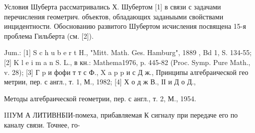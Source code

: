 \documentclass[10pt]{article}
\begin{document}
Условия Шуберта рассматривались Х. Шубертом [1] в связи с задачами перечисления геометрич. объектов, обладающих заданыыми свойствами инцидентности. Обоснованию развитого Шубертом исчисления посвящена 15-я проблема Гильберта (см. [2]).



Jum.: [1] S c h u b e r t H., "Mitt. Math. Ges. Hamburg", 1889 , Bd 1, S. 134-55; [2] K l e i m a n S. L., в кн.: Mathema1976, p. 445-82 (Proc. Symp. Pure Math., v. 28); [3] Г p и фофи т т с Ф., X a p p и с Д ж., Принципы алгебраической гео метрии, пер. с англ., т. 1, М., 1982; [4] Х о д ж В., ІІ и Д о Д.,

Методы алгебраической геометрии, пер. с англ., т. 2, М., 1954.



IIIУМ А ЛИТИВНБIИ-помеха, прибавляемая К сигналу при передаче его по каналу связи. Точнее, го-
\end{document}
